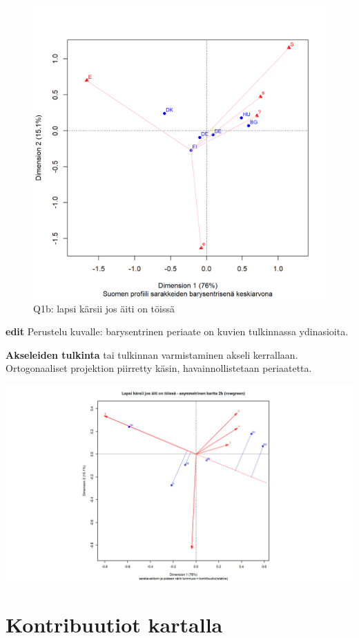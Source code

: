 \documentclass[
  finnish,
]{book}
\begin{document}
\begin{figure}

{\centering \includegraphics[width=0.7\linewidth]{JH_capaper_files/figure-latex/G1-3asymm3-1} 

}

\caption{Q1b: lapsi kärsii jos äiti on töissä}\label{fig:G1-3asymm3}
\end{figure}

\textbf{edit} Perustelu kuvalle: barysentrinen periaate on kuvien tulkinnassa ydinasioita.

\textbf{Akseleiden tulkinta} tai tulkinnan varmistaminen akseli kerrallaan. Ortogonaaliset
projektion piirretty käsin, havainnollistetaan periaatetta.

\begin{center}\includegraphics[width=0.9\linewidth]{img/simpleCAasymmTulk2} \end{center}

\hypertarget{kontribuutiot-kartalla}{%
\section{Kontribuutiot kartalla}\label{kontribuutiot-kartalla}}
\end{document}
